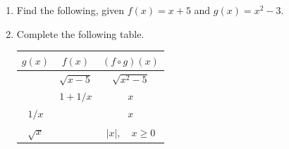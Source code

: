 \documentclass[11pt]{article}
\begin{document}
\begin{enumerate}
        \vspace{2ex}

        \item Find the following, given $\displaystyle f(x) = x + 5$ and $\displaystyle g(x) = x^2 - 3$.

        \begin{enumerate}[(a)]
        \end{enumerate}

        \item Complete the following table.\\[1ex]

        {\renewcommand{\arraystretch}{1.8}
            \begin{tabular}{|c|c|c|}
                \hline
                $g(x)$     & $f(x)$       & $(f \circ g)(x)$    \\ \hline
                            & $\sqrt{x-5}$ & $\sqrt{x^2-5}$      \\ \hline
                            & $1 + 1/x$    & $x$                 \\ \hline
                $1/x$      &              & $x$                 \\ \hline
                $\sqrt{x}$ &              & $|x|,\quad x \ge 0$ \\ \hline
            \end{tabular}}

    \end{enumerate}
\end{document}
